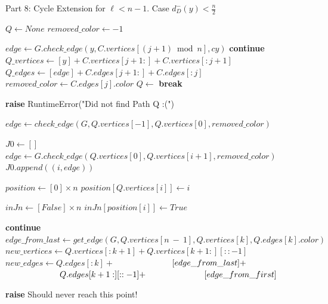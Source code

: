 \begin{algorithm}[H]
    \caption{Part 8: Cycle Extension for \( \ell < n - 1 \). Case \( d^-_D(y) < \frac{n}{2} \)}
    \begin{algorithmic}[1]
            \State $Q \gets None$
            \State $removed\_color \gets -1$

                \State $edge \gets G.check\_edge(y, C.vertices[(j + 1) \bmod n], cy)$
                    \State \textbf{continue}
                \EndIf
                \State $Q\_vertices \gets [y] + C.vertices[j + 1:] + C.vertices[:j + 1]$
                \State $Q\_edges \gets [edge] + C.edges[j + 1:] + C.edges[:j]$
                \State $removed\_color \gets C.edges[j].color$
                \State $Q \gets$ 
                \State \textbf{break}
            \EndFor

                \State \textbf{raise} RuntimeError("Did not find Path Q :(")
            \EndIf

            \State $edge \gets check\_edge(G, Q.vertices[-1], Q.vertices[0], removed\_color)$
                \State \Return {}
            \EndIf

            \State $J0 \gets []$
                \State $edge \gets G.check\_edge(Q.vertices[0], Q.vertices[i + 1], removed\_color)$
                    \State $J0.append((i, edge))$
                \EndIf
            \EndFor

            \State $position \gets [0] \times n$
                \State $position[Q.vertices[i]] \gets i$
            \EndFor

            \State $inJn \gets [False] \times n$
                \State $inJn[position[i]] \gets True$
            \EndFor

                    \State \textbf{continue}
                \EndIf
                \State $edge\_from\_last \gets get\_edge(G, Q.vertices[n~-~1], Q.vertices[k], Q.edges[k].color)$
                \State $new\_vertices \gets Q.vertices[:k+1] + Q.vertices[k+1:][::-1]$
                \State $new\_edges \gets Q.edges[:k] +$
                \State $\hspace{6.5em} [edge\_from\_last] +$
                \State $\hspace{6.5em} Q.edges[k+1:][::-1] +$
                \State $\hspace{6.5em} [edge\_from\_first]$
                \State \Return {}
            \EndFor

            \State \textbf{raise} Should never reach this point!
        \EndFunction
    \end{algorithmic}
\end{algorithm}


